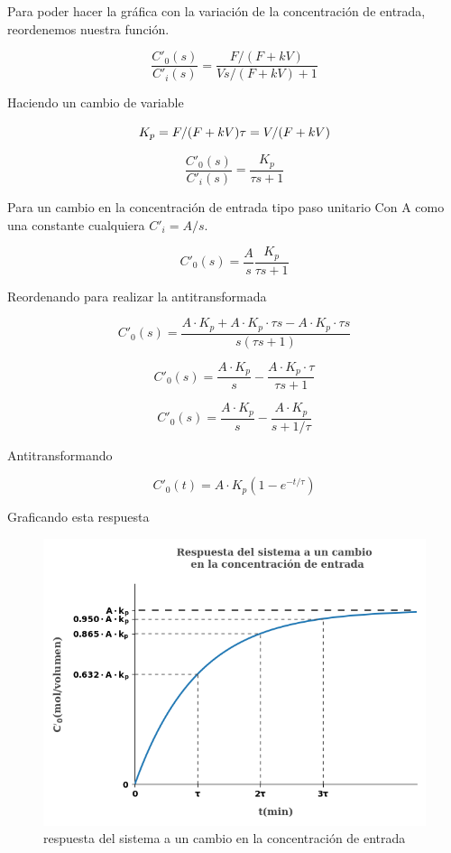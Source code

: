 \documentclass[
  letterpaper,
  DIV=11,
  numbers=noendperiod]{scrreprt}
\begin{document}
Para poder hacer la gráfica con la variación de la concentración de
entrada, reordenemos nuestra función.

\[
\frac{C'_0(s)}{C'_i(s)}=\frac{F/(F+kV)}{Vs/(F+kV)+1}
\]

Haciendo un cambio de variable

\[
K_p = F/(F+kV)\\
\tau = V/(F+kV)\\
\]

\[
\frac{C'_0(s)}{C'_i(s)}=\frac{K_p}{\tau s+1}
\]

Para un cambio en la concentración de entrada tipo paso unitario Con A
como una constante cualquiera \(C'_i=A/s\).

\[
C'_0(s)=\frac{A}{s}\frac{K_p}{\tau s+1}
\]

Reordenando para realizar la antitransformada

\[
C'_0(s)=\frac{A\cdot K_p+A\cdot K_p \cdot\tau s-A\cdot K_p \cdot\tau s}{s(\tau s+1)}
\]

\[
C'_0(s)=\frac{A\cdot K_p}{s}-\frac{A\cdot K_p \cdot\tau}{\tau s+1}
\]

\[
C'_0(s)=\frac{A\cdot K_p}{s}-\frac{A\cdot K_p}{s+1/\tau}
\]

Antitransformando

\[
C'_0(t) = A\cdot K_p(1-e^{-t/\tau})
\]

Graficando esta respuesta

\begin{figure}

{\centering \includegraphics{././images/p5.5-coughanowr/p55r.png}

}

\caption{respuesta del sistema a un cambio en la concentración de
entrada}

\end{figure}
\end{document}
